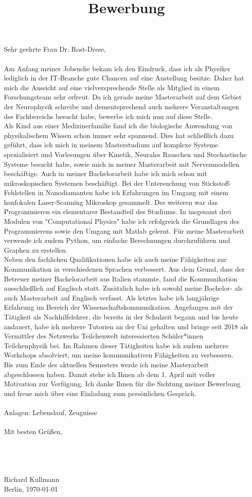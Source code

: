 \documentclass[11pt,a4paper]{moderncv}
\title{Bewerbung}
\begin{document}
\makecvtitle

Sehr geehrte Frau Dr. Rost-Drese,
\\\\
Am Anfang meiner Jobsuche bekam ich den Eindruck, dass ich als Physiker lediglich in der IT-Branche gute Chancen auf eine Anstellung besitze.
Daher hat mich die Aussicht auf eine vielversprechende Stelle als Mitglied in einem Forschungsteam sehr erfreut. Da ich gerade meine Masterarbeit auf dem Gebiet der Neurophysik schreibe und dementsprechend auch mehrere Veranstaltungen des Fachbereichs besucht habe, bewerbe ich mich nun auf diese Stelle.
\\
Als Kind aus einer Medizinerfamilie fand ich die biologische Anwendung von physikalischem Wissen schon immer sehr spannend. Dies hat schließlich dazu geführt, dass ich mich in meinem Masterstudium auf komplexe Systeme spezialisiert und Vorlesungen über Kinetik, Neurales Rauschen und Stochastische Systeme besucht habe, sowie mich in meiner Masterarbeit mit Nervenmodellen beschäftige. 
Auch in meiner Bachelorarbeit habe ich mich schon mit mikroskopischen Systemen beschäftigt. Bei der Untersuchung von Stickstoff-Fehlstellen in Nanodiamanten habe ich Erfahrungen im Umgang mit einem konfokalen Laser-Scanning Mikroskop gesammelt.
Des weiteren war das Programmieren ein elementarer Bestandteil des Studiums. In insgesamt drei Modulen von "Computational Physics" habe ich erfolgreich die Grundlagen des Programmierens sowie den Umgang mit Matlab gelernt. Für meine Masterarbeit verwende ich zudem Python, um einfache Berechnungen durchzuführen und Graphen zu erstellen.
\\
Neben den fachlichen Qualifikationen habe ich auch meine Fähigkeiten zur Kommunikation in verschiedenen Sprachen verbessert. Aus dem Grund, dass der Betreuer meiner Bachelorarbeit aus Italien stammte, fand die Kommunikation ausschließlich auf Englisch statt. Zusätzlich habe ich sowohl meine Bachelor- als auch Masterarbeit auf Englisch verfasst. Als letztes habe ich langjährige Erfahrung im Bereich der Wissenschaftskommunikation. Angefangen mit der Tätigkeit als Nachhilfelehrer, die bereits in der Schulzeit begann und bis heute andauert, habe ich mehrere Tutorien an der Uni gehalten und bringe seit 2018 als Vermittler des Netzwerks Teilchenwelt interessierten Schüler*innen Teilchenphysik bei. Im Rahmen dieser Tätigkeiten habe ich zudem mehrere Workshops absolviert, um meine kommunikativen Fähigkeiten zu verbessern.
\\
Bis zum Ende des aktuellen Semesters werde ich meine Masterarbeit abgeschlossen haben. Damit stehe ich Ihnen ab dem 1. April mit voller Motivation zur Verfügung. Ich danke Ihnen für die Sichtung meiner Bewerbung und freue mich über eine Einladung zum persönlichen Gespräch.
\\\\
Anlagen:
Lebenslauf,
Zeugnisse
\\\\
Mit besten Grüßen,
\\\\\\\\\\


Richard Kullmann\\
Berlin, \today
\end{document}
